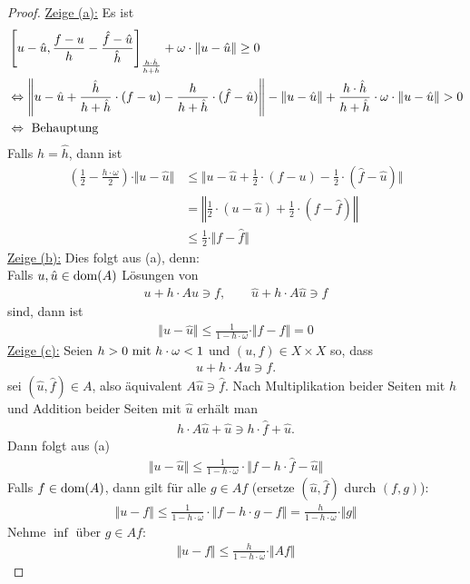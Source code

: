 \begin{proof}
\underline{Zeige (a):} Es ist
\begin{align*}
&\left[u-\hat{u},\frac{f-u}{h}-\frac{\hat{f}-\hat{u}}{\hat{h}}\right]_{\frac{h\cdot\hat{h}}{h+\hat{h}}}+\omega\cdot\Vert u-\hat{u}\Vert\geq0\\
&\gdw
\left\Vert u-\hat{u}+\frac{\hat{h}}{h+\hat{h}}\cdot(f-u)-\frac{h}{h+\hat{h}}\cdot(\hat{f}-\hat{u})\right\Vert
-\Vert u-\hat{u}\Vert+\frac{h\cdot\hat{h}}{h+\hat{h}}\cdot\omega\cdot\Vert u-\hat{u}\Vert>0\\
&\gdw\text{ Behauptung}
\end{align*}
Falls $h=\hat{h}$, dann ist
\begin{align*}
\left(\frac{1}{2}-\frac{h\cdot\omega}{2}\right)\cdot\Vert u-\hat{u}\Vert
&\leq
\Big\Vert u-\hat{u}+\frac{1}{2}\cdot(f-u)-\frac{1}{2}\cdot(\hat{f}-\hat{u})\Big\Vert\\
&=\left\Vert\frac{1}{2}\cdot(u-\hat{u})+\frac{1}{2}\cdot(f-\hat{f})\right\Vert\\
&\leq
\frac{1}{2}\cdot\Vert f-\hat{f}\Vert
\end{align*}
\underline{Zeige (b):} Dies folgt aus (a), denn:\\
Falls $u,\hat{u}\in\dom(A)$ Lösungen von
\begin{align*}
u+h\cdot Au\ni f,\qquad\hat{u}+h\cdot A\hat{u}\ni f
\end{align*}
sind, dann ist
\begin{align*}
\Vert u-\hat{u}\Vert\leq\frac{1}{1-h\cdot\omega}\cdot\Vert f-f\Vert=0
\end{align*}
\underline{Zeige (c):} Seien $h>0\mit h\cdot\omega<1$ und $(u,f)\in X\times X$ so, dass
\begin{align*}
u+h\cdot Au\ni f.
\end{align*}
sei $(\hat{u},\hat{f})\in A$, also äquivalent $A\hat{u}\ni\hat{f}$. Nach Multiplikation beider Seiten mit $h$ und Addition beider Seiten mit $\hat{u}$ erhält man
\begin{align*}
h\cdot A\hat{u}+\hat{u}\ni h\cdot\hat{f}+\hat{u}.
\end{align*}
Dann folgt aus (a)
\begin{align*}
\Vert u-\hat{u}\Vert\leq\frac{1}{1-h\cdot\omega}\cdot\big\Vert f-h\cdot\hat{f}-\hat{u}\big\Vert
\end{align*}
Falls $f\in\dom(A)$, dann gilt für alle $g\in Af$ (ersetze $(\hat{u},\hat{f})$ durch $(f,g)$):
\begin{align*}
\Vert u- f\Vert
\leq
\frac{1}{1-h\cdot\omega}\cdot\big\Vert f-h\cdot g-f\big\Vert
=\frac{h}{1-h\cdot\omega}\cdot\Vert g\Vert
\end{align*}
Nehme $\inf$ über $g\in Af$:
\begin{align*}
\Vert u-f\Vert\leq\frac{h}{1-h\cdot\omega}\cdot\Vert Af\Vert
\end{align*}
\end{proof}

